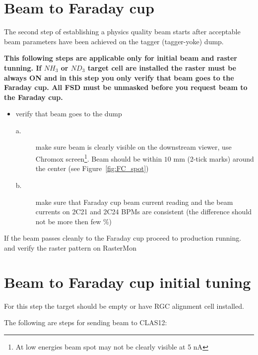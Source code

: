 \clearpage
\section{Beam to Faraday cup}
\indent

The second step of establishing a physics quality beam starts after acceptable beam parameters have been achieved on the tagger (tagger-yoke) dump. 

\vspace{5mm}
{\large\bf This following steps are applicable only for initial beam and raster tunning. If $NH_3$ or $ND_3$ target cell are installed the raster must be always ON and in this step you only verify that beam goes to the Faraday cup. All FSD must be unmasked before you request beam to the Faraday cup.}
\begin{itemize}
\item verify that beam goes to the dump 
\begin{description}
\item[a.] make sure beam is clearly visible on the downstream viewer, use Chromox screen\footnote{At low energies beam spot may not be clearly visible at 5 nA}. Beam should be within $10$ mm (2-tick marks) around the center (see Figure~\ref{fig:FC_spot})
\item[b.] make sure that Faraday cup beam current reading and the beam currents on 2C21 and 2C24 BPMs are consistent (the difference  should not be more then few \%)
\end{description}
\end{itemize}

If the beam passes cleanly to the Faraday cup proceed to production running. 
and verify the raster pattern on RasterMon \cite{rastermon}
\vspace{5mm}

\section{Beam to Faraday cup initial tuning}

For this step the target should be empty or have RGC alignment cell installed.

The following are steps for sending beam to CLAS12:

